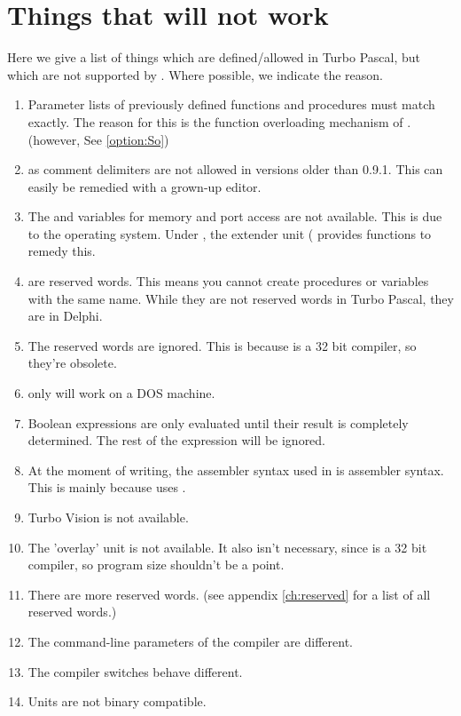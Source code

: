 \documentclass{report}
\newcommand{\seeo}[1]{See \ref{option:#1}}
\begin{document}
\section{Things that will not work}
Here we give a list of things which are defined/allowed in Turbo Pascal, but
which are not supported by \fpk. Where possible, we indicate the reason. 
\begin{enumerate}
\item Parameter lists of previously defined functions and procedures must
match exactly. The reason for this is the function overloading mechanism of
\fpk. (however, \seeo{So})
\item {} as comment delimiters are not allowed in versions
older than 0.9.1. This can easily be remedied with a grown-up editor. 
\item The  and  variables for memory and port
access are not available. This is due to the operating system. Under
\dos, the extender unit ( provides functions to remedy this.
\item {} are reserved words.
This means you cannot create procedures or variables with the same name.
While they are not reserved words in Turbo Pascal, they are in Delphi.
\item The reserved words  are ignored. This is
because \fpk is a 32 bit compiler, so they're obsolete.
\item {} only will work on a DOS machine.
\item Boolean expressions are only evaluated until their result is completely
determined. The rest of the expression will be ignored.
\item At the moment of writing, the assembler syntax used in \fpk is 
assembler syntax. This is mainly because \fpk uses \gnu {}.
\item Turbo Vision is not available.
\item The 'overlay' unit is not available. It also isn't necessary, since
\fpk is a 32 bit compiler, so program size shouldn't be a point.
\item There are more reserved words. (see appendix \ref{ch:reserved} for a
list of all reserved words.)
\item The command-line parameters of the compiler are different.
\item The compiler switches behave different.
\item Units are not binary compatible.
\end{enumerate}
\end{document}
